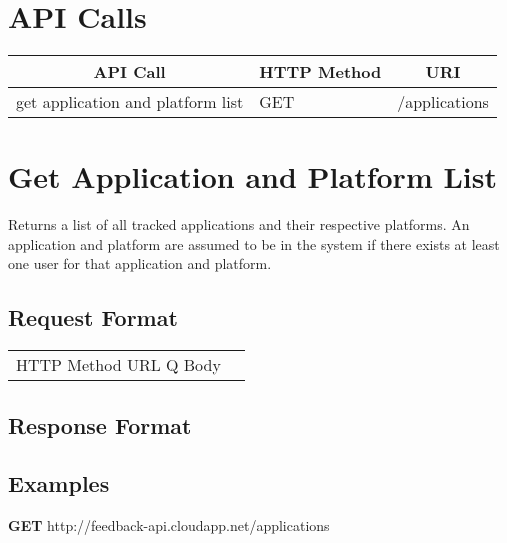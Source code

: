 
\section{API Calls}
\begin{center}
\begin{tabular}{|l||l||l|}
\hline

\multicolumn{1}{|c||}{\textbf{API Call}} &
\multicolumn{1}{c||}{\textbf{HTTP Method}} &
\multicolumn{1}{c|}{\textbf{URI}} \\

\hline
\hline
get application and platform list  & GET & /applications \\
\hline
\end{tabular}
\end{center}

\section{Get Application and Platform List}

Returns a list of all tracked applications and their respective platforms.
An application and platform are assumed to be in the system if there exists
at least one user for that application and platform.

\subsection{Request Format}
\begin{center}
\begin{tabular}{|l||l|}
\hline
HTTP Method
URL
Q
Body
\hline
\end{tabular}
\end{center}


\subsection{Response Format}

\subsection{Examples}
\begin{center}
\textbf{GET} http://feedback-api.cloudapp.net/applications
\end{center}


